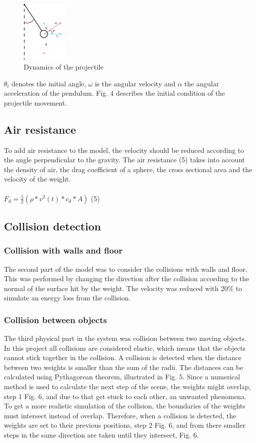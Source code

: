 \documentclass[a4paper,12pt,twoside,english]{article}
\begin{document}
\begin{figure}[h]
\centering
\includegraphics[height=3cm]{bilder/projectile_dynamics.png}
\caption{Dynamics of the projectile}
\end{figure}

 $\theta_i $ denotes the initial angle, $\omega$ is the angular velocity and $\alpha$ the angular acceleration of the pendulum. Fig. 4 describes the initial condition of the projectile movement.
 
\subsection{Air resistance}
To add air resistance to the model, the velocity should be reduced according to the angle perpendicular to the gravity. The air resistance (5) takes into account the density of air, the drag coefficient of a sphere, the cross sectional area and the velocity of the weight.\\ \\
$F_d = \frac{1}{2}( \rho * v^2(t) * c_{d} * A)$ \hfill (5) 

\subsection{Collision detection}
\subsubsection{Collision with walls and floor}
The second part of the model was to consider the collisions with walls and floor. This was performed by changing the direction after the collision according to the normal of the surface hit by the weight. The velocity was reduced with 20\%  to simulate an energy loss from the collision.

\subsubsection{Collision between objects}
The third physical part in the system was collision between two moving objects. In this project all collisions are considered elastic, which means that the objects cannot stick together in the collision.
A collision is detected when the distance between two weights is smaller than the sum of the radii. The distances can be calculated using Pythagorean theorem, illustrated in Fig. 5. 
Since a numerical method is used to calculate the next step of the scene, the weights might overlap, step 1 Fig. 6, and due to that get stuck to each other, an unwanted phenomena. To get a more realistic simulation of the collision, the boundaries of the weights must intersect instead of overlap. Therefore, when a collision is detected, the weights are set to their previous positions, step 2 Fig. 6, and from there smaller steps in the same direction are taken until they intersect, Fig. 6. 
\end{document}

